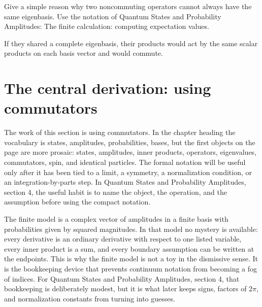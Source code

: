 \begin{exercise}
Give a simple reason why two noncommuting operators cannot always have the same eigenbasis.  Use the notation of Quantum States and Probability Amplitudes: The finite calculation: computing expectation values.
\begin{answer}
If they shared a complete eigenbasis, their products would act by the same scalar products on each basis vector and would commute.
\end{answer}
\end{exercise}



\section{The central derivation: using commutators}













The work of this section is using commutators.  In the chapter heading the vocabulary is states, amplitudes, probabilities, bases, but the first objects on the page are more prosaic: states, amplitudes, inner products, operators, eigenvalues, commutators, spin, and identical particles.  The formal notation will be useful only after it has been tied to a limit, a symmetry, a normalization condition, or an integration-by-parts step.  In Quantum States and Probability Amplitudes, section 4, the useful habit is to name the object, the operation, and the assumption before using the compact notation.

The finite model is a complex vector of amplitudes in a finite basis with probabilities given by squared magnitudes.  In that model no mystery is available: every derivative is an ordinary derivative with respect to one listed variable, every inner product is a sum, and every boundary assumption can be written at the endpoints.  This is why the finite model is not a toy in the dismissive sense.  It is the bookkeeping device that prevents continuum notation from becoming a fog of indices.  For Quantum States and Probability Amplitudes, section 4, that bookkeeping is deliberately modest, but it is what later keeps signs, factors of \(2\pi\), and normalization constants from turning into guesses.

